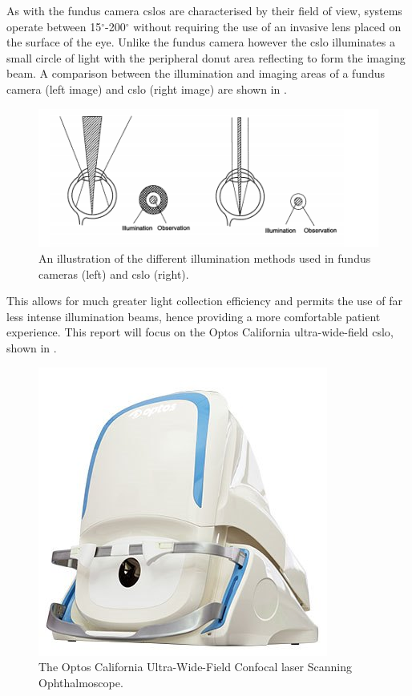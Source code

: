 As with the fundus camera \gls{cslo}s are characterised by their field of view,
systems operate between 15$^\circ$-200$^\circ$ without requiring the use
of an invasive lens placed on the surface of the eye. Unlike the fundus
camera however the \gls{cslo} illuminates a small circle of light with the
peripheral donut area reflecting to form the imaging beam. A comparison
between the illumination and imaging areas of a fundus camera (left image)
and \gls{cslo} (right image) are shown in  .

\begin{figure}[H]
\centering
\includegraphics{figures/illumination}
\caption{An illustration of the different illumination methods used in fundus cameras (left) and \gls{cslo} (right).\cite{5_bennett_2015}}
\label{fig:illum}
   \end{figure}

This allows for much greater light collection efficiency and permits the use
of far less intense illumination beams, hence providing a more comfortable
patient experience.\cite{5_bennett_2015} This report will focus on the Optos
California ultra-wide-field \gls{cslo}, shown in .

\begin{figure}[H]
\centering
\includegraphics{figures/california}
\caption{The Optos California Ultra-Wide-Field Confocal \gls{laser} Scanning Ophthalmoscope.\cite{1_optos.com_2015}}
\label{fig:cali}
   \end{figure}



